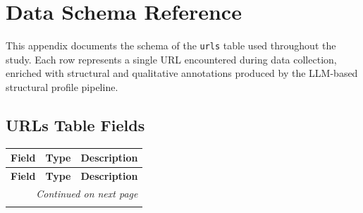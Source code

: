 \chapter{Data Schema Reference}
\label{app:data-schema}

This appendix documents the schema of the \texttt{urls} table used throughout the study. Each row represents a single URL encountered during data collection, enriched with structural and qualitative annotations produced by the LLM-based structural profile pipeline.

\section{URLs Table Fields}
\label{sec:urls-table-fields}

\begin{longtable}{@{}llp{7.5cm}@{}}
\toprule
\textbf{Field} & \textbf{Type} & \textbf{Description} \\
\midrule
\endfirsthead

\toprule
\textbf{Field} & \textbf{Type} & \textbf{Description} \\
\midrule
\endhead

\midrule
\multicolumn{3}{r}{\emph{Continued on next page}} \\
\bottomrule
\endfoot

\bottomrule
\endlastfoot


\end{longtable}
